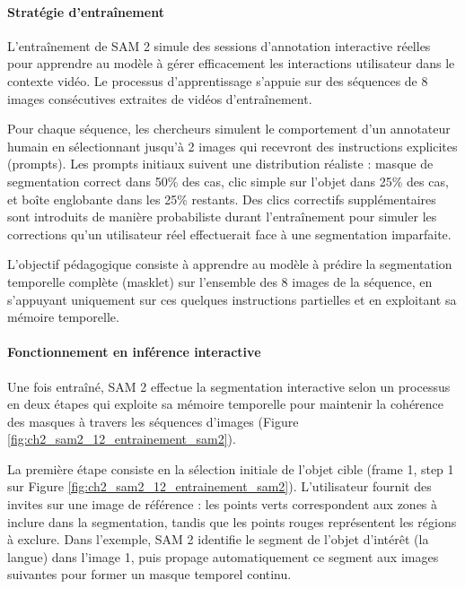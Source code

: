 \paragraph{Stratégie d'entraînement}

L'entraînement de SAM 2 simule des sessions d'annotation interactive réelles pour apprendre au modèle à gérer efficacement les interactions utilisateur dans le contexte vidéo. Le processus d'apprentissage s'appuie sur des séquences de 8 images consécutives extraites de vidéos d'entraînement.

Pour chaque séquence, les chercheurs simulent le comportement d'un annotateur humain en sélectionnant jusqu'à 2 images qui recevront des instructions explicites (prompts). Les prompts initiaux suivent une distribution réaliste : masque de segmentation correct dans 50\% des cas, clic simple sur l'objet dans 25\% des cas, et boîte englobante dans les 25\% restants. Des clics correctifs supplémentaires sont introduits de manière probabiliste durant l'entraînement pour simuler les corrections qu'un utilisateur réel effectuerait face à une segmentation imparfaite.

L'objectif pédagogique consiste à apprendre au modèle à prédire la segmentation temporelle complète (masklet) sur l'ensemble des 8 images de la séquence, en s'appuyant uniquement sur ces quelques instructions partielles et en exploitant sa mémoire temporelle.

\paragraph{Fonctionnement en inférence interactive}

Une fois entraîné, SAM 2 effectue la segmentation interactive selon un processus en deux étapes qui exploite sa mémoire temporelle pour maintenir la cohérence des masques à travers les séquences d'images (Figure \ref{fig:ch2_sam2_12_entrainement_sam2}).

La première étape consiste en la sélection initiale de l'objet cible (frame 1, step 1 sur Figure \ref{fig:ch2_sam2_12_entrainement_sam2}). L'utilisateur fournit des invites sur une image de référence : les points verts correspondent aux zones à inclure dans la segmentation, tandis que les points rouges représentent les régions à exclure. Dans l'exemple, SAM 2 identifie le segment de l'objet d'intérêt (la langue) dans l'image 1, puis propage automatiquement ce segment aux images suivantes pour former un masque temporel continu.

